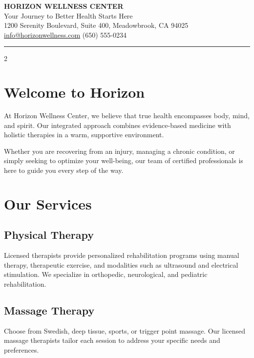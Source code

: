 \documentclass[
    language=english,
    doctype=brochure,
    institution=none,
]{../../omnilatex}
\begin{document}
\begin{center}
    {\LARGE\bfseries HORIZON WELLNESS CENTER}\\[4pt]
    {\large Your Journey to Better Health Starts Here}\\[2pt]
    {\small 1200 Serenity Boulevard, Suite 400, Meadowbrook, CA 94025}\\
    {\small \href{mailto:info@horizonwellness.com}{info@horizonwellness.com}
    \hfill (650) 555-0234}
\end{center}

\vspace{0.5em}
\noindent\rule{\textwidth}{0.4pt}
\vspace{0.5em}

\begin{multicols}{2}

\section*{Welcome to Horizon}

At Horizon Wellness Center, we believe that true health encompasses body, mind,
and spirit. Our integrated approach combines evidence-based medicine with
holistic therapies in a warm, supportive environment.

Whether you are recovering from an injury, managing a chronic condition, or
simply seeking to optimize your well-being, our team of certified professionals
is here to guide you every step of the way.

\section*{Our Services}

\subsection*{Physical Therapy}
Licensed therapists provide personalized rehabilitation programs using manual
therapy, therapeutic exercise, and modalities such as ultrasound and electrical
stimulation. We specialize in orthopedic, neurological, and pediatric
rehabilitation.

\subsection*{Massage Therapy}
Choose from Swedish, deep tissue, sports, or trigger point massage. Our licensed
massage therapists tailor each session to address your specific needs and
preferences.


\end{multicols}
\end{document}
